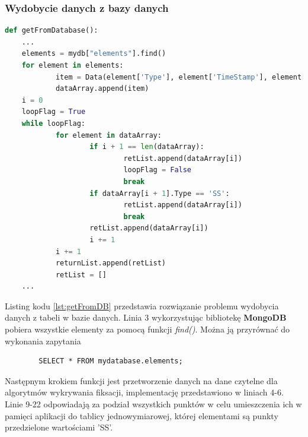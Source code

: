\subsubsection{Wydobycie danych z bazy danych}
\label{ssec:getDB}
\begin{lstlisting}[language=Python, caption=Wydobycie danych z bazy danych, label={lst:getFromDB}]
def getFromDatabase():
    ...
    elements = mydb["elements"].find()
    for element in elements:
            item = Data(element['Type'], element['TimeStamp'], element['CoordX'], element['CoordY'])
            dataArray.append(item)
    i = 0
    loopFlag = True
    while loopFlag:
            for element in dataArray:
                    if i + 1 == len(dataArray):
                            retList.append(dataArray[i])
                            loopFlag = False
                            break
                    if dataArray[i + 1].Type == 'SS':
                            retList.append(dataArray[i])
                            break
                    retList.append(dataArray[i])
                    i += 1
            i += 1
            returnList.append(retList)
            retList = []
    ...
    \end{lstlisting}
Listing kodu \ref{lst:getFromDB} przedstawia rozwiązanie problemu wydobycia danych z tabeli w bazie danych. Linia 3 wykorzystując bibliotekę \textbf{MongoDB} pobiera wszystkie elementy za pomocą funkcji \emph{find()}. Można ją przyrównać do wykonania zapytania 
\begin{verbatim}
        SELECT * FROM mydatabase.elements;
\end{verbatim}
Następnym krokiem funkcji jest przetworzenie danych na dane czytelne dla algorytmów wykrywania fiksacji, implementację przedstawiono w liniach 4-6. Linie 9-22 odpowiadają za podział wszystkich punktów w celu umieszczenia ich w pamięci aplikacji do tablicy jednowymiarowej, której elementami są punkty przedzielone wartościami 'SS'.
